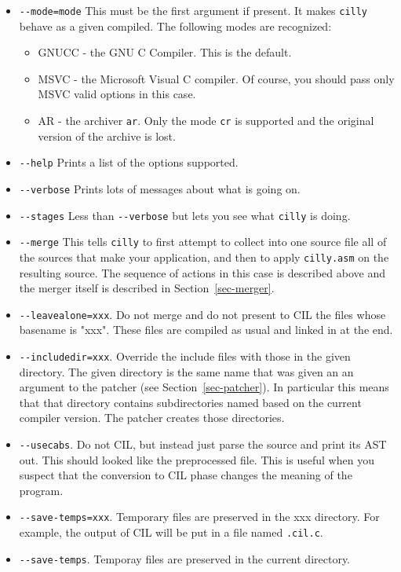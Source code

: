 \documentclass{article}
\def\secref#1{Section~\ref{sec-#1}}
\def\t#1{{\tt #1}}
\begin{document}
\begin{itemize}
\item \t{-{}-mode=mode} This must be the first argument if present. It makes
\t{cilly} behave as a given compiled. The following modes are recognized: 
     \begin{itemize}
        \item GNUCC - the GNU C Compiler. This is the default.
        \item MSVC - the Microsoft Visual C compiler. Of course, you should
                     pass only MSVC valid options in this case. 
        \item AR - the archiver \t{ar}. Only the mode \t{cr} is supported and
                   the original version of the archive is lost. 
     \end{itemize}
\item \t{-{}-help} Prints a list of the options supported.
\item \t{-{}-verbose} Prints lots of messages about what is going on.
\item \t{-{}-stages} Less than \t{-{}-verbose} but lets you see what \t{cilly}
                   is doing. 
\item \t{-{}-merge} This tells \t{cilly} to first attempt to collect into one
source file all of the sources that make your application, and then to apply
\t{cilly.asm} on the resulting source. The sequence of actions in this case is
described above and the merger itself is described in \secref{merger}.

\item \t{-{}-leavealone=xxx}. Do not merge and do not present to CIL the files
whose basename is "xxx". These files are compiled as usual and linked in at
the end. 
\item \t{-{}-includedir=xxx}. Override the include files with those in the given
directory. The given directory is the same name that was given an an argument
to the patcher (see \secref{patcher}). In particular this means that
that directory contains subdirectories named based on the current compiler
version. The patcher creates those directories. 
\item \t{-{}-usecabs}. Do not CIL, but instead just parse the source and print
its AST out. This should looked like the preprocessed file. This is useful
when you suspect that the conversion to CIL phase changes the meaning of the
program. 
\item \t{-{}-save-temps=xxx}. Temporary files are preserved in the xxx
  directory.  For example, the output of CIL will be put in a file
  named \t{*.cil.c}.
\item \t{-{}-save-temps}. Temporay files are preserved in the current directory.
\end{itemize}
 
\end{document}
